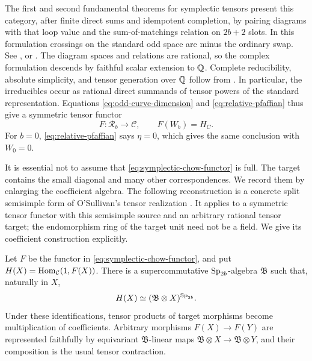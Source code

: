 The first and second fundamental theorems for symplectic tensors
present this category, after finite direct sums and idempotent
completion, by pairing diagrams with that loop value and the
sum-of-matchings relation on \(2b+2\) slots.  In this formulation
crossings on the standard odd space are minus the ordinary swap.
See \cite[Theorems~2.2 and~2.13]{RW15}, or
\cite[Theorems~4.6, 4.8, and~5.9]{LZ15}.
The diagram spaces and relations are rational, so the complex
formulation descends by faithful scalar extension to \(\mathbb Q\).
Complete reducibility, absolute simplicity, and tensor generation over
\(\mathbb Q\) follow from \cite[Theorems~4.14, 22.2, and~22.42, and
Paragraph~22.4]{Milne2022}. In particular, the irreducibles occur as
rational direct summands of tensor powers of the standard representation.
Equations
\eqref{eq:odd-curve-dimension} and \eqref{eq:relative-pfaffian} thus
give a symmetric tensor functor
\begin{equation}
 \label{eq:symplectic-chow-functor}
 F\colon\mathcal R_b\longrightarrow\mathcal C,
 \qquad F(W_b)=H_C.
\end{equation}
For \(b=0\), \eqref{eq:relative-pfaffian} says \(\eta=0\), which gives
the same conclusion with \(W_0=0\).

It is essential not to assume that \eqref{eq:symplectic-chow-functor}
is full.  The target contains the small diagonal and many other
correspondences.  We record them by enlarging the coefficient algebra.
The following reconstruction is a concrete split semisimple form of
O'Sullivan's tensor realization
\cite[Lemma~2.3.1\textup{(i)}]{OSullivan2011}.  It applies to a
symmetric tensor functor with this semisimple source and an arbitrary
rational tensor target; the endomorphism ring of the target unit need
not be a field.  We give its coefficient construction explicitly.

\begin{lemma}
 \label{lem:coefficient-algebra}
Let \(F\) be the functor in \eqref{eq:symplectic-chow-functor}, and put
\(H(X)=\operatorname{Hom}_{\mathcal C}(1,F(X))\).  There is a supercommutative
\(\operatorname{Sp}_{2b}\)-algebra \(\mathfrak B\) such that, naturally in \(X\),
\begin{equation}
 \label{eq:coefficient-invariants}
 H(X)\simeq(\mathfrak B\otimes X)^{\operatorname{Sp}_{2b}}.
\end{equation}
Under these identifications, tensor products of target morphisms
become multiplication of coefficients.  Arbitrary morphisms
\(F(X)\to F(Y)\) are represented faithfully by equivariant
\(\mathfrak B\)-linear maps
\(\mathfrak B\otimes X\to\mathfrak B\otimes Y\), and their composition
is the usual tensor contraction.
\end{lemma}

